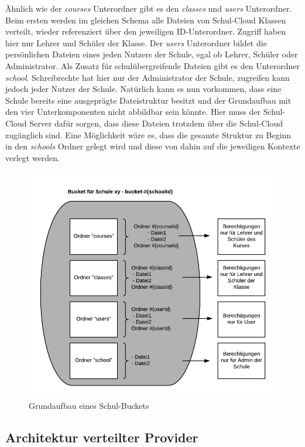 Ähnlich wie der \textit{courses} Unterordner gibt es den \textit{classes} und \textit{users} Unterordner. Beim ersten werden im gleichen Schema alle Dateien von Schul-Cloud Klassen verteilt, wieder referenziert über den jeweiligen ID-Unterordner. Zugriff haben hier nur Lehrer und Schüler der Klasse. Der \textit{users} Unterordner bildet die persönlichen Dateien eines jeden Nutzers der Schule, egal ob Lehrer, Schüler oder Administrator. Als Zusatz für schulübergreifende Dateien gibt es den Unterordner \textit{school}. Schreibrechte hat hier nur der Administrator der Schule, zugreifen kann jedoch jeder Nutzer der Schule. Natürlich kann es nun vorkommen, dass eine Schule bereits eine ausgeprägte Dateistruktur besitzt und der Grundaufbau mit den vier Unterkomponenten nicht abbildbar sein könnte. Hier muss der Schul-Cloud Server dafür sorgen, dass diese Dateien trotzdem über die Schul-Cloud zugänglich sind. Eine Möglichkeit wäre es, dass die gesamte Struktur zu Beginn in den \textit{schools} Ordner gelegt wird und diese von dahin auf die jeweiligen Kontexte verlegt werden.

\begin{figure}[H]
	\centering
	\includegraphics[width=0.8\linewidth]{images/AufbauDateiverwaltung}
	\caption[Caption for concept]{Grundaufbau eines Schul-Buckets}
	\label{fig:aufbau}
\end{figure}

\subsection{Architektur verteilter Provider}

